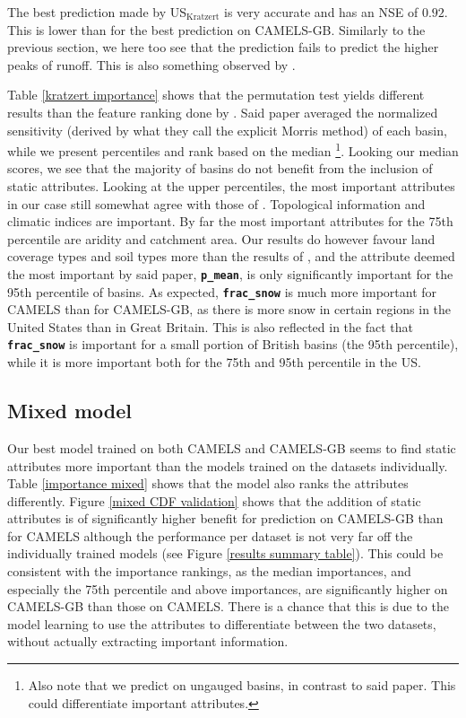 The best prediction made by US$_\text{Kratzert}$ is very accurate and has an NSE of $0.92$. 
This is lower than for the best prediction on CAMELS-GB. Similarly to the previous 
section, we here too
see that the prediction fails to predict the higher peaks of runoff. 
This is also something observed by \citet{lstm_first_paper}.

Table \ref{kratzert importance} shows that the permutation test yields different 
results than the feature ranking done by \citet{lstm_second_paper}. Said paper 
averaged the normalized sensitivity (derived by what they call the explicit Morris 
method) of each basin, while we present percentiles and rank based on the median
\footnote{Also note that we predict on ungauged basins, in contrast to said paper. 
This could differentiate important attributes.}. 
Looking our median scores, we see that the majority of basins do not benefit 
from the inclusion of static attributes. Looking at the upper percentiles, the 
most important attributes in our case still somewhat agree with those of 
\citet{lstm_second_paper}. Topological information and climatic indices are important. 
By far the most important attributes for the 75th percentile are aridity and 
catchment area. Our results do however favour land coverage types and soil types 
more than the results of \citet{lstm_second_paper}, and the attribute deemed the most important by 
said paper, \textbf{\texttt{p\_mean}}, is only significantly important 
for the 95th percentile of basins. As expected, \textbf{\texttt{frac\_snow}} is 
much more important for CAMELS than for CAMELS-GB, as there is more snow 
in certain regions in the United States than in Great Britain. This is also reflected in the fact that 
\textbf{\texttt{frac\_snow}} is important for a small portion of British basins (the 95th percentile), 
while it is more important both for the 75th and 95th percentile in the US. 

\subsection{Mixed model}
Our best model trained on both CAMELS and CAMELS-GB seems to find static attributes
more important 
than the models trained on the datasets individually. Table \ref{importance mixed} 
shows that the model also ranks the attributes differently. Figure \ref{mixed CDF validation} 
shows that the addition of static attributes is of significantly higher benefit for 
prediction on CAMELS-GB than for CAMELS although the performance per dataset is not 
very far off the individually trained models (see Figure \ref{results summary table}).
This could be consistent with the importance rankings, as 
the median importances, and especially the 75th percentile and above importances, are 
significantly higher on CAMELS-GB than those on CAMELS. There is a chance that this 
is due to the model learning to use the attributes to differentiate between the 
two datasets, without actually extracting important information.


